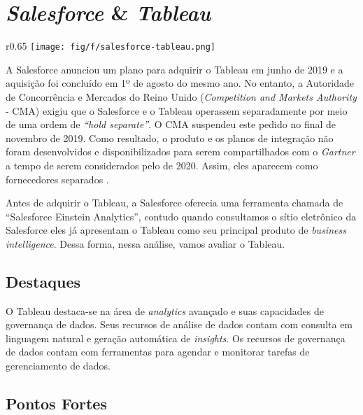 \section{\emph{Salesforce} \& \emph{Tableau}}
\label{sub-salesforce}

\begin{wrapfigure}[5]{r}{0.65\textwidth}     
    \centering
    \texttt{[image: fig/f/salesforce-tableau.png]}
\end{wrapfigure}

A Salesforce anunciou um plano para adquirir o Tableau em junho de 2019 e a aquisição foi concluído em 1º de agosto do mesmo ano. No entanto, a Autoridade de Concorrência e Mercados do Reino Unido (\emph{Competition and Markets Authority} - CMA) exigiu que o Salesforce e o Tableau operassem separadamente por meio de uma ordem de \emph{``hold separate''}. O CMA suspendeu este pedido no final de novembro de 2019. Como resultado, o produto e
os planos de integração não foram desenvolvidos e disponibilizados para serem compartilhados com o \emph{Gartner} a tempo de serem considerados pelo \relGMQ \xspace de 2020. Assim, eles aparecem como fornecedores separados \cite{gartner:magicquadrant}.

Antes de adquirir o Tableau, a Salesforce oferecia uma ferramenta chamada de ``Salesforce Einstein Analytics'', contudo quando consultamos o sítio eletrônico da Salesforce eles já apresentam o Tableau como seu principal produto de \emph{business intelligence}. Dessa forma, nessa análise, vamos avaliar o Tableau.



\subsection*{Destaques}

O Tableau destaca-se na área de \emph{analytics} avançado e suas capacidades de governança de dados. Seus recursos de análise de dados contam com consulta em linguagem natural e geração automática de \emph{insights}. Os recursos de governança de dados contam com ferramentas para agendar e monitorar tarefas de gerenciamento de dados.


\subsection*{Pontos Fortes}

